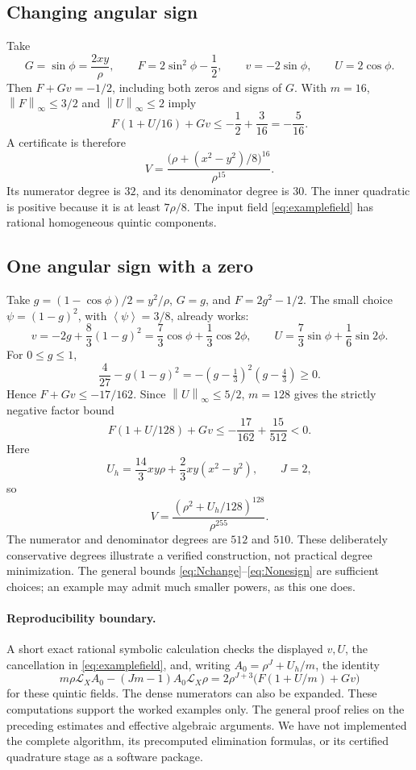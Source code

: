 \documentclass[11pt]{article}
\theoremstyle{remark}\newtheorem{remark}[theorem]{Remark}
\newcommand{\mean}[1]{\left\langle #1\right\rangle}
\newcommand{\norm}[1]{\left\|#1\right\|_\infty}
\newcommand{\LX}{\mathcal L_X}
\begin{document}
\subsection{Changing angular sign}

Take
\[
 G=\sin\phi=\frac{2xy}{\rho},\qquad
 F=2\sin^2\phi-\frac12,\qquad
 v=-2\sin\phi,\qquad U=2\cos\phi.
\]
Then \(F+Gv=-1/2\), including both zeros and signs of \(G\).
With \(m=16\), \(\norm F\leq3/2\) and \(\norm U\leq2\) imply
\[
                F(1+U/16)+Gv\leq-\frac12+\frac3{16}
                              =-\frac5{16}.
\]
A certificate is therefore
\[
               V=\frac{\bigl(\rho+(x^2-y^2)/8\bigr)^{16}}{\rho^{15}}.
\]
Its numerator degree is \(32\), and its denominator degree is \(30\).
The inner quadratic is positive because it is at least \(7\rho/8\).
The input field \eqref{eq:examplefield} has rational homogeneous quintic components.

\subsection{One angular sign with a zero}

Take \(g=(1-\cos\phi)/2=y^2/\rho\), \(G=g\), and \(F=2g^2-1/2\).
The small choice \(\psi=(1-g)^2\), with \(\mean\psi=3/8\), already works:
\[
 v=-2g+\frac83(1-g)^2
   =\frac73\cos\phi+\frac13\cos2\phi,\qquad
 U=\frac73\sin\phi+\frac16\sin2\phi.
\]
For \(0\leq g\leq1\),
\[
 \frac4{27}-g(1-g)^2
       =-(g-\tfrac13)^2(g-\tfrac43)\geq0.
\]
Hence \(F+Gv\leq-17/162\).
Since \(\norm U\leq5/2\), \(m=128\) gives the strictly negative factor bound
\[
 F(1+U/128)+Gv
       \leq-\frac{17}{162}+\frac{15}{512}<0.
\]
Here
\[
 U_h=\frac{14}{3}xy\rho+\frac23xy(x^2-y^2),\qquad J=2,
\]
so
\[
                    V=\frac{(\rho^2+U_h/128)^{128}}{\rho^{255}}.
\]
The numerator and denominator degrees are \(512\) and \(510\).
These deliberately conservative degrees illustrate a verified construction, not practical degree minimization. The general bounds \eqref{eq:Nchange}--\eqref{eq:Nonesign} are sufficient choices; an example may admit much smaller powers, as this one does.

\paragraph{Reproducibility boundary.}
A short exact rational symbolic calculation checks the displayed \(v,U\), the cancellation in \eqref{eq:examplefield}, and, writing \(A_0=\rho^J+U_h/m\), the identity
\[
 m\rho\LX A_0-(Jm-1)A_0\LX\rho
   =2\rho^{J+3}\bigl(F(1+U/m)+Gv\bigr)
\]
for these quintic fields. The dense numerators can also be expanded. These computations support the worked examples only. The general proof relies on the preceding estimates and effective algebraic arguments. We have not implemented the complete algorithm, its precomputed elimination formulas, or its certified quadrature stage as a software package.
\end{document}

